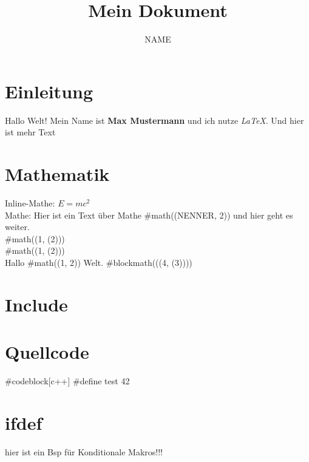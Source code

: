 \documentclass{article}
\title{Mein Dokument}
\author{NAME}
\begin{document}
\maketitle

\section{Einleitung}
Hallo Welt! 
Mein Name ist \textbf{Max Mustermann} und ich nutze \textit{LaTeX}.
Und hier ist mehr Text

\section{Mathematik}
Inline-Mathe: $E = mc^2$  \\
Mathe: Hier ist ein Text über Mathe #math(\frac(NENNER, 2)) und hier geht es weiter.\\  

#math(\frac(1, \sqrt(2))) \\

#math(\pow(1, \sqrt(2))) \\

Hallo #math(\frac(1, 2)) Welt.  
#blockmath(\sqrt(\frac(4, \abs(3))))

\section{Include}


\section{Quellcode}

#codeblock[c++]{
#define test 42
}


\section{ifdef}
hier ist ein Bsp für Konditionale Makros!!!
\endif
\end{document}

